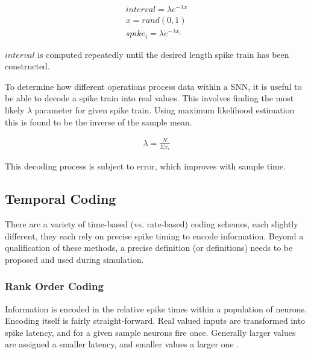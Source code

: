     \begin{align}
      interval = \lambda e^{-\lambda x} \\
      x = rand(0,1) \\
      spike_i = \lambda e^{-\lambda x_i}
    \end{align}

    $interval$ is computed repeatedly until the desired length spike train has
    been constructed.
    
    
    
    To determine how different operations process data within a SNN, it is
    useful to be able to decode a spike train into real values. This involves
    finding the most likely $\lambda$ parameter for given spike train. Using
    maximum likelihood estimation this is found to be the inverse of the sample
    mean.
    
    \begin{align}
        \lambda = \frac{N}{\Sigma x_i}
    \end{align}
    
    This decoding process is subject to error, which improves with sample time.
    
    \subsection{Temporal Coding}
    There are a variety of time-based (vs. rate-based) coding schemes, each
    slightly different, they each rely on precise spike timing to encode
    information. Beyond a qualification of these methods, a precise definition
    (or definitions) needs to be proposed and used during simulation.
    
    \subsubsection{Rank Order Coding}
    Information is encoded in the relative spike times within a population of
    neurons. Encoding itself is fairly straight-forward. Real valued inputs are
    transformed into spike latency, and for a given sample neurons fire
    once. Generally larger values are assigned a smaller latency, and smaller
    values a larger one \cite{delorme_2001}.
    
